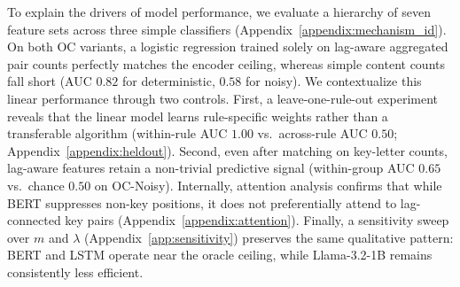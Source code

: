 \documentclass{article}
\theoremstyle{plain}
\theoremstyle{definition}
\theoremstyle{remark}
\begin{document}
To explain the drivers of model performance, we evaluate a hierarchy of seven feature sets across three simple classifiers (Appendix~\ref{appendix:mechanism_id}). On both OC variants, a logistic regression trained solely on lag-aware aggregated pair counts perfectly matches the encoder ceiling, whereas simple content counts fall short (AUC $0.82$ for deterministic, $0.58$ for noisy). We contextualize this linear performance through two controls. First, a leave-one-rule-out experiment reveals that the linear model learns rule-specific weights rather than a transferable algorithm (within-rule AUC $1.00$ vs.\ across-rule AUC $0.50$; Appendix~\ref{appendix:heldout}). Second, even after matching on key-letter counts, lag-aware features retain a non-trivial predictive signal (within-group AUC $0.65$ vs.\ chance $0.50$ on OC-Noisy). Internally, attention analysis confirms that while BERT suppresses non-key positions, it does not preferentially attend to lag-connected key pairs (Appendix~\ref{appendix:attention}). Finally, a sensitivity sweep over $m$ and $\lambda$ (Appendix~\ref{app:sensitivity}) preserves the same qualitative pattern: BERT and LSTM operate near the oracle ceiling, while Llama-3.2-1B remains consistently less efficient.

\end{document}
